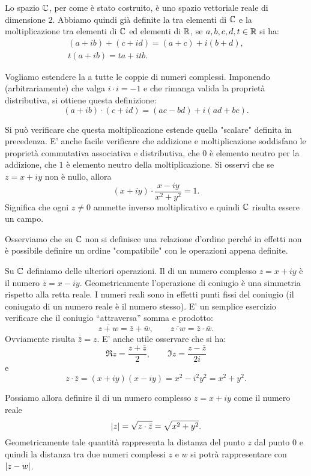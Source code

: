 Lo spazio $\mathbb C$, per come
è stato costruito, è uno spazio vettoriale reale di dimensione $2$.
Abbiamo quindi già definite la 
tra elementi di $\mathbb C$ e la moltiplicazione
tra elementi di $\mathbb C$ ed elementi di $\mathbb R$,
se $a,b,c,d,t\in \mathbb R$ si ha:
\begin{gather*}
 (a+ib) + (c+id) = (a+c) + i (b+d), \\
 t(a+ib) = ta + itb.
\end{gather*}

Vogliamo estendere la  a tutte le coppie di numeri complessi.
Imponendo (arbitrariamente) che valga $i\cdot i = -1$ e che rimanga
valida la proprietà distributiva, si ottiene
questa definizione:
\[
   (a+ib) \cdot (c+id) = (ac-bd) + i(ad+bc).
\]

Si può verificare che questa moltiplicazione estende quella "scalare" definita
in precedenza.
E' anche facile verificare che addizione e moltiplicazione soddisfano
le proprietà commutativa associativa e distributiva,
che $0$ è elemento neutro per la addizione, che $1$ è elemento neutro
della moltiplicazione.
Si osservi che se $z=x+iy$ non è nullo, allora
\[
  (x+iy) \cdot \frac{x-iy}{x^2+y^2} = 1.
\]
Significa che ogni $z\neq 0$ ammette inverso moltiplicativo e quindi $\mathbb C$
risulta essere un campo.

Osserviamo che su $\mathbb C$ non si definisce una relazione d'ordine perché
in effetti non è possibile definire un ordine "compatibile" con le operazioni
appena definite.

Su $\mathbb C$ definiamo delle ulteriori operazioni.
Il 
di un numero complesso $z=x+iy$ è il numero
$\bar z = x - iy$. Geometricamente l'operazione di coniugio è una simmetria
rispetto alla retta reale. I numeri reali sono in effetti punti fissi del
coniugio (il coniugato di un numero reale è il numero stesso).
E' un semplice esercizio verificare che il coniugio ``attraversa''
somma e prodotto:
\[
\overline{z+w} = \bar z + \bar w, \qquad
\overline{z\cdot w} = \bar z \cdot \bar w.
\]
Ovviamente risulta $\overline {\bar z} = z$.
E' anche utile osservare che si ha:
\begin{equation}\label{eq:re_im}
  \Re z = \frac{z+\bar z}{2}, \qquad
  \Im z = \frac{z-\bar z}{2i}
\end{equation}
e
\[
z \cdot \bar z = (x+iy)(x-iy) = x^2-i^2y^2 = x^2+y^2.
\]

Possiamo allora definire il
 di un numero complesso $z=x+iy$
come il numero reale
\[
{\left|z\right|} = \sqrt{z\cdot\bar z} = \sqrt{x^2+y^2}.
\]
Geometricamente tale quantità rappresenta la distanza del punto $z$
dal punto $0$ e quindi la distanza tra due numeri complessi $z$ e
$w$ si potrà rappresentare con ${\left|z-w\right|}$.

